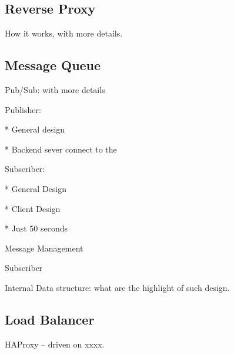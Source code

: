 \subsection{Reverse Proxy\\}

How it works, with more details.

\subsection{Message Queue\\}

Pub/Sub: with more details

Publisher: 

    * General design

    * Backend sever connect to the 

Subscriber: 

    * General Design

    * Client Design

    * Just 50 seconds

Message Management

Subscriber

Internal Data structure: what are the highlight of such design.

\subsection{Load Balancer\\}

HAProxy -- driven on xxxx.

